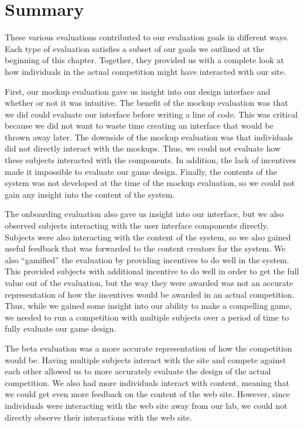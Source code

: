 \section{Summary}

These various evaluations contributed to our evaluation goals in different ways. Each type of evaluation satisfies a subset of our goals we outlined at the beginning of this chapter. Together, they provided us with a complete look at how individuals in the actual competition might have interacted with our site.

First, our mockup evaluation gave us insight into our design interface and whether or not it was intuitive. The benefit of the mockup evaluation was that we did could evaluate our interface before writing a line of code. This was critical because we did not want to waste time creating an interface that would be thrown away later. The downside of the mockup evaluation was that individuals did not directly interact with the mockups. Thus, we could not evaluate how these subjects interacted with the components. In addition, the lack of incentives made it impossible to evaluate our game design. Finally, the contents of the system was not developed at the time of the mockup evaluation, so we could not gain any insight into the content of the system.

The onboarding evaluation also gave us insight into our interface, but we also observed subjects interacting with the user interface components directly. Subjects were also interacting with the content of the system, so we also gained useful feedback that was forwarded to the content creators for the system. We also ``gamified'' the evaluation by providing incentives to do well in the system. This provided subjects with additional incentive to do well in order to get the full value out of the evaluation, but the way they were awarded was not an accurate representation of how the incentives would be awarded in an actual competition. Thus, while we gained some insight into our ability to make a compelling game, we needed to run a competition with multiple subjects over a period of time to fully evaluate our game design.

The beta evaluation was a more accurate representation of how the competition would be. Having multiple subjects interact with the site and compete against each other allowed us to more accurately evaluate the design of the actual competition. We also had more individuals interact with content, meaning that we could get even more feedback on the content of the web site. However, since individuals were interacting with the web site away from our lab, we could not directly observe their interactions with the web site.

